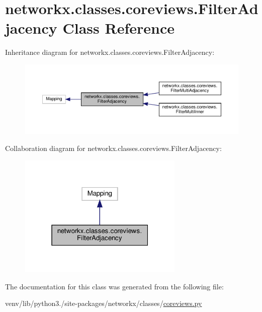 \hypertarget{classnetworkx_1_1classes_1_1coreviews_1_1FilterAdjacency}{}\section{networkx.\+classes.\+coreviews.\+Filter\+Adjacency Class Reference}
\label{classnetworkx_1_1classes_1_1coreviews_1_1FilterAdjacency}


Inheritance diagram for networkx.\+classes.\+coreviews.\+Filter\+Adjacency\+:
\nopagebreak
\begin{figure}[H]
\begin{center}
\leavevmode
\includegraphics[width=350pt]{classnetworkx_1_1classes_1_1coreviews_1_1FilterAdjacency__inherit__graph}
\end{center}
\end{figure}


Collaboration diagram for networkx.\+classes.\+coreviews.\+Filter\+Adjacency\+:
\nopagebreak
\begin{figure}[H]
\begin{center}
\leavevmode
\includegraphics[width=223pt]{classnetworkx_1_1classes_1_1coreviews_1_1FilterAdjacency__coll__graph}
\end{center}
\end{figure}


The documentation for this class was generated from the following file\+:\begin{DoxyCompactItemize}
\item 
venv/lib/python3./site-\/packages/networkx/classes/\hyperlink{coreviews_8py}{coreviews.\+py}\end{DoxyCompactItemize}
